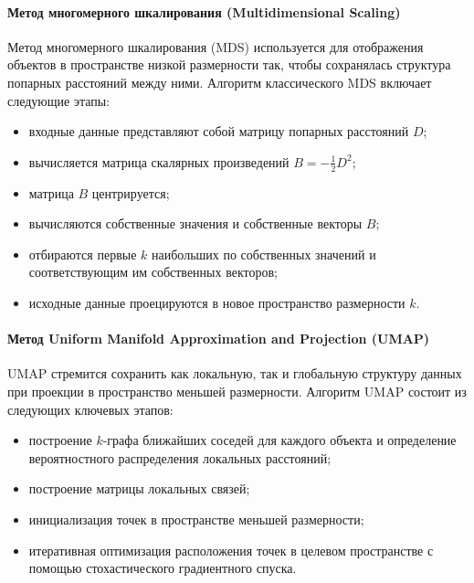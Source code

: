         \paragraph{Метод многомерного шкалирования (Multidimensional Scaling)}
            Метод многомерного шкалирования (MDS) используется для отображения объектов в пространстве низкой размерности так, чтобы сохранялась структура попарных расстояний между ними. Алгоритм классического MDS включает следующие этапы:
            \begin{itemize}
                \item входные данные представляют собой матрицу попарных расстояний \(D\);
                \item вычисляется матрица скалярных произведений \(B = -\frac{1}{2} D^2\);
                \item матрица \(B\) центрируется;
                \item вычисляются собственные значения и собственные векторы \(B\);
                \item отбираются первые \(k\) наибольших по собственных значений и соответствующим им собственных векторов;
                \item исходные данные проецируются в новое пространство размерности \(k\).
            \end{itemize}

        \paragraph{Метод Uniform Manifold Approximation and Projection (UMAP)}
            UMAP стремится сохранить как локальную, так и глобальную структуру данных при проекции в пространство меньшей размерности. Алгоритм UMAP состоит из следующих ключевых этапов:
            \begin{itemize}
                \item построение \(k\)-графа ближайших соседей для каждого объекта и определение вероятностного распределения локальных расстояний;
                \item построение матрицы локальных связей;
                \item инициализация точек в пространстве меньшей размерности;
                \item итеративная оптимизация расположения точек в целевом пространстве с помощью стохастического градиентного спуска.
            \end{itemize}


